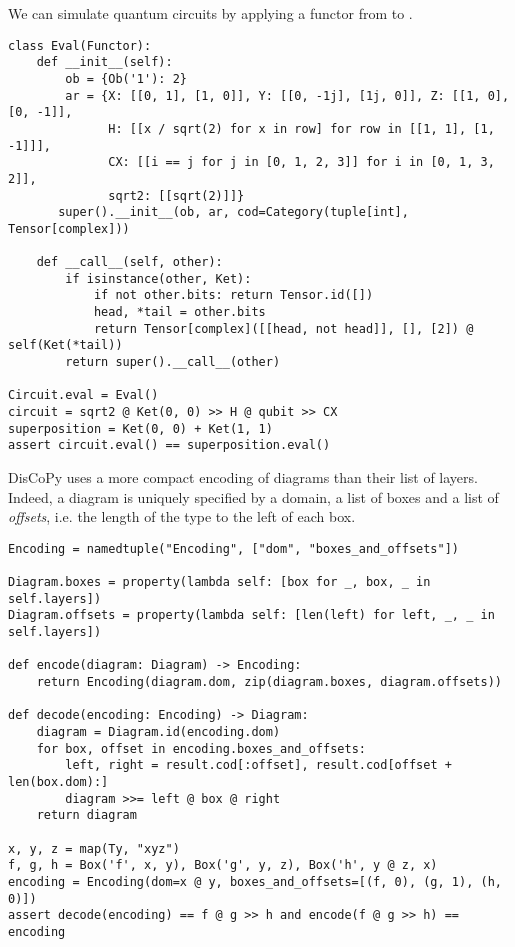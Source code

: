 \begin{example}
We can simulate quantum circuits by applying a functor from  to .
\begin{verbatim}
class Eval(Functor):
    def __init__(self):
        ob = {Ob('1'): 2}
        ar = {X: [[0, 1], [1, 0]], Y: [[0, -1j], [1j, 0]], Z: [[1, 0], [0, -1]],
              H: [[x / sqrt(2) for x in row] for row in [[1, 1], [1, -1]]],
              CX: [[i == j for j in [0, 1, 2, 3]] for i in [0, 1, 3, 2]],
              sqrt2: [[sqrt(2)]]}
       super().__init__(ob, ar, cod=Category(tuple[int], Tensor[complex]))

    def __call__(self, other):
        if isinstance(other, Ket):
            if not other.bits: return Tensor.id([])
            head, *tail = other.bits
            return Tensor[complex]([[head, not head]], [], [2]) @ self(Ket(*tail))
        return super().__call__(other)

Circuit.eval = Eval()
circuit = sqrt2 @ Ket(0, 0) >> H @ qubit >> CX
superposition = Ket(0, 0) + Ket(1, 1)
assert circuit.eval() == superposition.eval()
\end{verbatim}
\end{example}

\begin{remark}
DisCoPy uses a more compact encoding of diagrams than their list of layers.
Indeed, a diagram is uniquely specified by a domain, a list of boxes and a list of \emph{offsets}, i.e. the length of the type to the left of each box.

\begin{verbatim}
Encoding = namedtuple("Encoding", ["dom", "boxes_and_offsets"])

Diagram.boxes = property(lambda self: [box for _, box, _ in self.layers])
Diagram.offsets = property(lambda self: [len(left) for left, _, _ in self.layers])

def encode(diagram: Diagram) -> Encoding:
    return Encoding(diagram.dom, zip(diagram.boxes, diagram.offsets))

def decode(encoding: Encoding) -> Diagram:
    diagram = Diagram.id(encoding.dom)
    for box, offset in encoding.boxes_and_offsets:
        left, right = result.cod[:offset], result.cod[offset + len(box.dom):]
        diagram >>= left @ box @ right
    return diagram

x, y, z = map(Ty, "xyz")
f, g, h = Box('f', x, y), Box('g', y, z), Box('h', y @ z, x)
encoding = Encoding(dom=x @ y, boxes_and_offsets=[(f, 0), (g, 1), (h, 0)])
assert decode(encoding) == f @ g >> h and encode(f @ g >> h) == encoding
\end{verbatim}
\end{remark}

